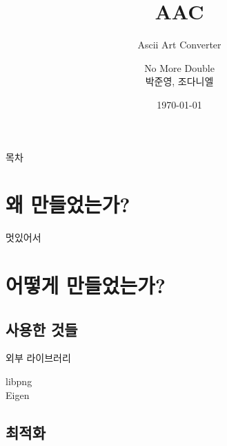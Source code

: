 \documentclass{beamer}
\author{No More Double \\ 박준영, 조다니엘}
\date{\today}
\title{AAC}
\institute{Sogang CSE2035}
\subtitle{Ascii Art Converter}
\begin{document}
	\begin{frame}
		\titlepage
	\end{frame}
	\begin{frame}{목차}
		\tableofcontents
	\end{frame}

\section{왜 만들었는가?}
	\begin{frame}{멋있어서}
	\end{frame}
\section{어떻게 만들었는가?}
\subsection{사용한 것들}
	\begin{frame}{외부 라이브러리}
		\begin{description}
			\item[libpng]
			\item[Eigen]

		\end{description}
	\end{frame}
\subsection{최적화}
\end{document}
